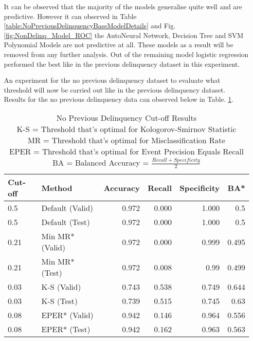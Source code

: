 It can be observed that the majority of the models generalise quite well and are predictive. However it can observed in Table \ref{table:NoPreviousDelinquencyBaseModelDetails} and Fig. \ref{fig:NonDelinq_Model_ROC} the AutoNeural Network, Decision Tree and SVM Polynomial Models are not predictive at all. These models as a result will be removed from any further analysis. Out of the remaining model logistic regression performed the best like in the previous delinquency dataset in this experiment. 

An experiment for the no previous delinquency dataset to evaluate what threshold will now be carried out like in the previous delinquency dataset. Results for the no previous delinquency data can observed below in Table. \ref{table:NoDelinquencyModelCutoff}.

\begin{table}[H]
	\centering
	\small
		\begin{tabular}{|l|l|r|r|r|r|}
			\hline
			\textbf{Cut-off} & \textbf{Method} & \textbf{Accuracy} & \textbf{Recall} & \textbf{Specificity}  & \textbf{BA*}  \\ \hline
			0.5             & Default (Valid)  & 0.972             & 0.000           & 1.000                  & 0.5     \\
			0.5             & Default (Test)   & 0.972             & 0.000           & 1.000                  & 0.5     \\ \hline
			
			0.21            & Min MR* (Valid)   & 0.972             & 0.000           & 0.999                    & 0.495   \\
			0.21            & Min MR* (Test)    & \cellcolor{yellow!25}0.972             & 0.008                         & \cellcolor{yellow!25}0.99  & 0.499     \\ \hline
			
			0.03            & K-S (Valid)      & 0.743             & 0.538           & 0.749                 & 0.644     \\
			0.03            & K-S (Test)       & 0.739             & \cellcolor{yellow!25}0.515                          & 0.745  & \cellcolor{yellow!25}0.63     \\ \hline
			
			0.08            & EPER* (Valid)     & 0.942             & 0.146           & 0.964                   & 0.556   \\
			0.08            & EPER* (Test)      & 0.942             & 0.162           & 0.963                 & 0.563     \\ \hline
		\end{tabular}
	\caption{No Previous Delinquency Cut-off Results
			\\ K-S = Threshold that's optimal for Kologorov-Smirnov Statistic
			\\ MR = Threshold that's optimal for Misclassification Rate
			\\ EPER = Threshold that's optimal for Event Precision Equals Recall
			\\ BA = Balanced Accuracy = $\frac{Recall + Specificity }{2}$
			}
	\label{table:NoDelinquencyModelCutoff}
\end{table}

